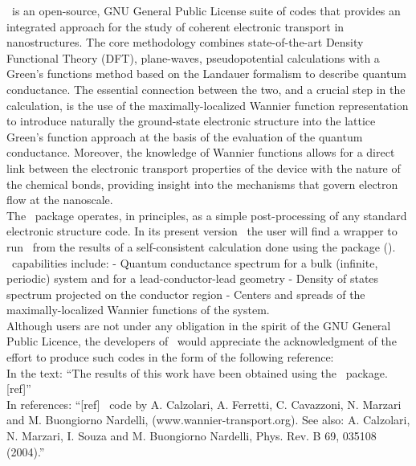  \WANT\ is an open-source, GNU
General Public License suite of codes that provides an integrated
approach for the study of coherent electronic transport in
nanostructures. The core methodology combines state-of-the-art
Density Functional Theory (DFT), plane-waves, pseudopotential
calculations with a Green's functions method based on the Landauer
formalism to describe quantum conductance. The essential
connection between the two, and a crucial step in the calculation,
is the use of the maximally-localized Wannier function
representation to introduce naturally the ground-state electronic
structure into the lattice Green's function approach at the basis
of the evaluation of the quantum conductance. Moreover, the
knowledge of Wannier functions allows for a
direct link between the electronic transport properties of the
device with the nature of the chemical bonds, providing insight
into the mechanisms that
govern electron flow at the nanoscale.\\

\noindent The \WANT\ package operates, in principles, as a simple
post-processing of any standard electronic structure code. In its
present version \WANTVERSION\ the user will find a wrapper to run
\WANT\ from the results of a self-consistent calculation done
using the \PWSCF package (\PWSCFURL).\\

\noindent \WANT\ capabilities include: 
- Quantum conductance spectrum for a bulk (infinite, periodic)
system and for a lead-conductor-lead geometry - Density of states
spectrum projected on the conductor region - Centers and spreads of the
maximally-localized Wannier functions of the system.\\

\newpage
{} Although users are not under any
obligation in the spirit of the GNU General Public Licence, the
developers of \WANT\ would appreciate the acknowledgment of the
effort to produce such codes in the form of the following
reference:\\

\noindent In the text: ``The results of this work have been
obtained using the \WANT\ package.[ref]''\\

\noindent In references: ``[ref] \WANT\ code by A. Calzolari, A.
Ferretti, C. Cavazzoni, N. Marzari and M. Buongiorno Nardelli,
(www.wannier-transport.org). See also: A. Calzolari, N. Marzari,
I. Souza and M. Buongiorno Nardelli, Phys. Rev. B 69, 035108
(2004).''\\
  \vspace{0.25in}

